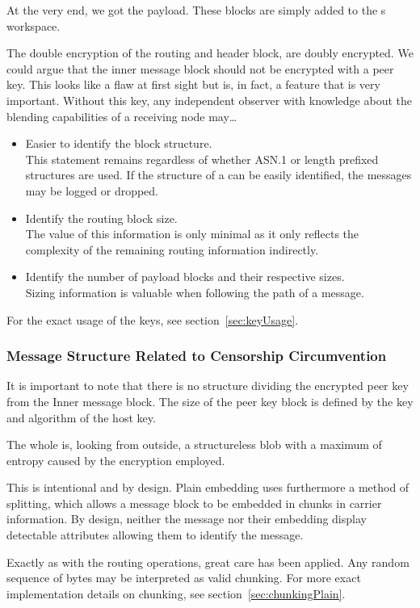 At the very end, we got the payload. These blocks are simply added to the s workspace.

The double encryption of the routing and header block, are doubly encrypted. We could argue that the inner message block should not be encrypted with a peer key. This looks like a flaw at first sight but is, in fact, a feature that is very important. Without this key, any independent observer with knowledge about the blending capabilities of a receiving node may\ldots
\begin{itemize}
	\item Easier to identify the block structure.\\ 
	This statement remains regardless of whether ASN.1 or length prefixed structures are used. If the structure of a \VortexMessage can be easily identified, the messages may be logged or dropped.
	\item Identify the routing block size.\\
	The value of this information is only minimal as it only reflects the complexity of the remaining routing information indirectly.
	\item Identify the number of payload blocks and their respective sizes. \\
	Sizing information is valuable when following the path of a message.
\end{itemize}

For the exact usage of the keys, see section~\ref{sec:keyUsage}.

\subsubsection{Message Structure Related to Censorship Circumvention}
It is important to note that there is no structure dividing the encrypted peer key from the Inner message block. The size of the peer key block is defined by the key and algorithm of the host key. 

The whole \VortexMessage is, looking from outside, a structureless blob with a maximum of entropy caused by the encryption employed. 

This is intentional and by design. Plain embedding uses furthermore a method of splitting, which allows a message block to be embedded in chunks in carrier information. By design, neither the message nor their embedding display detectable attributes allowing them to identify the message. 

Exactly as with the routing operations, great care has been applied. Any random sequence of bytes may be interpreted as valid chunking. For more exact implementation details on chunking, see section~\ref{sec:chunkingPlain}.

